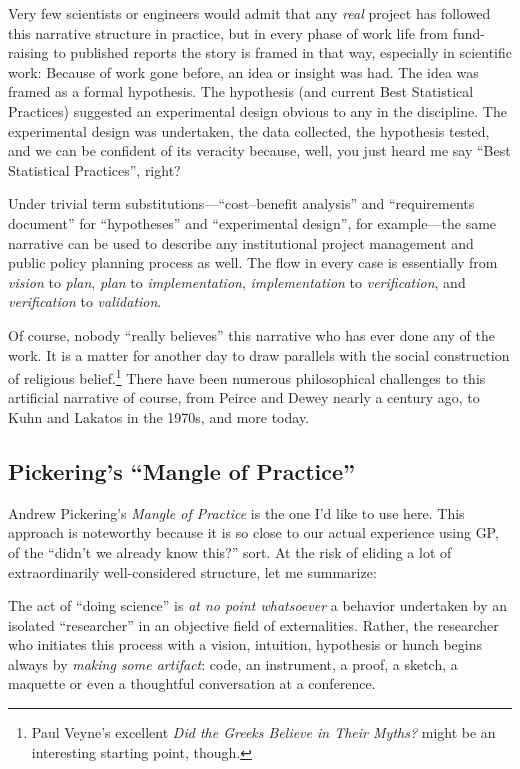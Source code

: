 Very few scientists or engineers would admit that any \emph{real} project has followed this narrative structure in practice, but in every phase of work life from fund-raising to published reports the story is framed in that way, especially in scientific work: Because of work gone before, an idea or insight was had. The idea was framed as a formal hypothesis. The hypothesis (and current Best Statistical Practices) suggested an experimental design obvious to any in the discipline. The experimental design was undertaken, the data collected, the hypothesis tested, and we can be confident of its veracity because, well, you just heard me say ``Best Statistical Practices'', right?

Under trivial term substitutions---``cost--benefit analysis'' and ``requirements document'' for ``hypotheses'' and ``experimental design'', for example---the same narrative can be used to describe any institutional project management and public policy planning process as well. The flow in every case is essentially from \emph{vision} to \emph{plan}, \emph{plan} to \emph{implementation}, \emph{implementation} to \emph{verification}, and \emph{verification} to \emph{validation}.

Of course, nobody ``really believes'' this narrative who has ever done any of the work. It is a matter for another day to draw parallels with the social construction of religious belief.\footnote{Paul Veyne's excellent \emph{Did the Greeks Believe in Their Myths?} might be an interesting starting point, though.} There have been numerous philosophical challenges to this artificial narrative of course, from Peirce and Dewey nearly a century ago, to Kuhn and Lakatos in the 1970s, and more today.

\subsection{Pickering's ``Mangle of Practice''}\hypertarget{pickerings-mangle-of-practice}{}\label{pickerings-mangle-of-practice}

Andrew Pickering's \emph{Mangle of Practice} is the one I'd like to use here. This approach is noteworthy because it is so close to our actual experience using GP, of the ``didn't we already know this?'' sort. At the risk of eliding a lot of extraordinarily well-considered structure, let me summarize:

The act of ``doing science'' is \emph{at no point whatsoever} a behavior undertaken by an isolated ``researcher'' in an objective field of externalities. Rather, the researcher who initiates this process with a vision, intuition, hypothesis or hunch begins always by \emph{making some artifact}: code, an instrument, a proof, a sketch, a maquette or even a thoughtful conversation at a conference.

